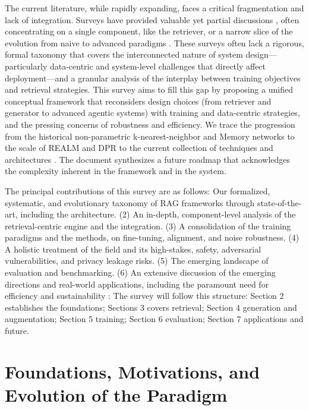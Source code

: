 \documentclass[11pt,a4paper]{article}
\begin{document}
The current literature, while rapidly expanding, faces a critical fragmentation and lack of integration. Surveys have provided valuable yet partial discussions \cite{arxiv:2404.10981v1,arxiv:2404.19543v1,arxiv:2407.21059v1}, often concentrating on a single component, like the retriever, or a narrow slice of the evolution from naive to advanced paradigms \cite{arxiv:2312.10997v5,arxiv:2407.21059v1}. These surveys often lack a rigorous, formal taxonomy that covers the interconnected nature of system design---particularly data-centric and system-level challenges that directly affect deployment---and a granular analysis of the interplay between training objectives and retrieval strategies. This survey aims to fill this gap by proposing a unified conceptual framework that reconsiders design choices (from retriever and generator to advanced agentic systems) with training and data-centric strategies, and the pressing concerns of robustness and efficiency. We trace the progression from the historical non-parametric k-nearest-neighbor and Memory networks \cite{arxiv:2205.12674v3} to the scale of REALM and DPR \cite{arxiv:2005.11401v4} to the current collection of techniques and architectures \cite{arxiv:2407.21059v1,arxiv:2401.15884v2}. The document synthesizes a future roadmap that acknowledges the complexity inherent in the framework and in the system.

The principal contributions of this survey are as follows: Our formalized, systematic, and evolutionary taxonomy of RAG frameworks through state-of-the-art, including the architecture. (2) An in-depth, component-level analysis of the retrieval-centric engine and the integration. (3) A consolidation of the training paradigms and the methods, on fine-tuning, alignment, and noise robustness. (4) A holistic treatment of the field and its high-stakes, safety, adversarial vulnerabilities, and privacy leakage risks. (5) The emerging landscape of evaluation and benchmarking. (6) An extensive discussion of the emerging directions and real-world applications, including the paramount need for efficiency and sustainability \cite{arxiv:2312.03863v3}: The survey will follow this structure: Section 2 establishes the foundations; Sections 3 covers retrieval; Section 4 generation and augmentation; Section 5 training; Section 6 evaluation; Section 7 applications and future.


\section{Foundations, Motivations, and Evolution of the Paradigm}
\end{document}
